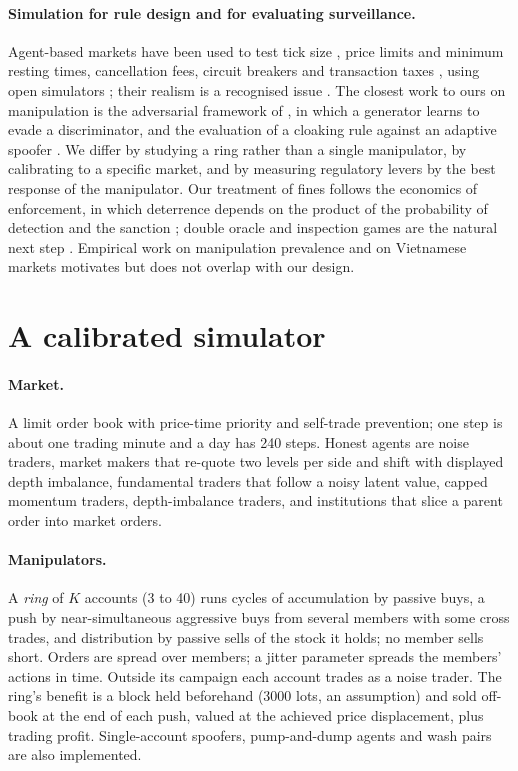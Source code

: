 \documentclass[11pt,a4paper]{article}
\begin{document}
\paragraph{Simulation for rule design and for evaluating surveillance.} Agent-based markets have been used to test tick size \citep{zhao2020}, price limits \citep{zhang2016} and minimum resting times, cancellation fees, circuit breakers and transaction taxes \citep{leal2019}, using open simulators \citep{byrd2020}; their realism is a recognised issue \citep{vyetrenko2019,platt2018}. The closest work to ours on manipulation is the adversarial framework of \citet{wang2020}, in which a generator learns to evade a discriminator, and the evaluation of a cloaking rule against an adaptive spoofer \citep{wang2018}. We differ by studying a ring rather than a single manipulator, by calibrating to a specific market, and by measuring regulatory levers by the best response of the manipulator. Our treatment of fines follows the economics of enforcement, in which deterrence depends on the product of the probability of detection and the sanction \citep{becker1968,polinsky2000}; double oracle and inspection games are the natural next step \citep{mcmahan2003,lanctot2017,avenhaus2002}. Empirical work on manipulation prevalence \citep{aggarwal2006,comerton2014,khwaja2005} and on Vietnamese markets \citep{nguyen2017,nguyen2023} motivates but does not overlap with our design.

\section{A calibrated simulator}\label{sec:sim}

\paragraph{Market.} A limit order book with price-time priority and self-trade prevention; one step is about one trading minute and a day has 240 steps. Honest agents are noise traders, market makers that re-quote two levels per side and shift with displayed depth imbalance, fundamental traders that follow a noisy latent value, capped momentum traders, depth-imbalance traders, and institutions that slice a parent order into market orders.

\paragraph{Manipulators.} A \emph{ring} of $K$ accounts (3 to 40) runs cycles of accumulation by passive buys, a push by near-simultaneous aggressive buys from several members with some cross trades, and distribution by passive sells of the stock it holds; no member sells short. Orders are spread over members; a jitter parameter spreads the members' actions in time. Outside its campaign each account trades as a noise trader. The ring's benefit is a block held beforehand (3000 lots, an assumption) and sold off-book at the end of each push, valued at the achieved price displacement, plus trading profit. Single-account spoofers, pump-and-dump agents and wash pairs are also implemented.
\end{document}

